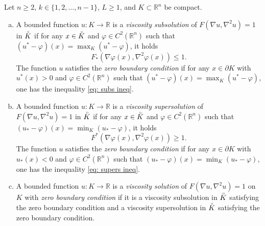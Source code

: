 \documentclass[11pt]{amsart}
\numberwithin{equation}{section}
\begin{document}
\begin{defn} \label{def:visc}
Let $n\geq 2$, $k\in\{1,2,\ldots,n-1\}$, $L\ge1$, and $K\subset \mathbb{R}^n$ be compact.
\begin{enumerate}[(a)]
\item A bounded function $u\!: K \to \mathbb{R}$ is a \textit{viscosity subsolution} of $F(\nabla u, \nabla^2 u)=1$ in $\accentset{\circ}{K}$ if for any $x\in\accentset{\circ}{K}$ and $\varphi\in C^2(\mathbb{R}^n)$ such that $(u^{\ast}-\varphi)(x)=\max_K (u^{\ast}-\varphi)$, it holds
\begin{equation}\label{eq: subs ineq}
F_{\ast}(\nabla \varphi(x), \nabla^2 \varphi(x))\leq 1.
\end{equation}
The function $u$ satisfies the \textit{zero boundary condition} if for any $x\in\partial K$ with $u^{\ast}(x)>0$ and $\varphi\in C^2(\mathbb{R}^n)$ such that $(u^{\ast}-\varphi)(x)=\max_K (u^{\ast}-\varphi)$, one has the inequality \eqref{eq: subs ineq}. \\
\item A bounded function $u\!: K \to \mathbb{R}$ is a \textit{viscosity supersolution} of $F(\nabla u, \nabla^2 u)=1$ in $\accentset{\circ}{K}$ if for any $x\in\accentset{\circ}{K}$ and $\varphi\in C^2(\mathbb{R}^n)$ such that $(u_{\ast}-\varphi)(x)=\min_K (u_{\ast}-\varphi)$, it holds
\begin{equation}\label{eq: supers ineq}
F^{\ast}(\nabla \varphi(x), \nabla^2 \varphi(x))\geq 1.
\end{equation}
The function $u$ satisfies the \textit{zero boundary condition} if for any $x\in\partial K$ with $u_{\ast}(x)<0$ and $\varphi\in C^2(\mathbb{R}^n)$ such that $(u_{\ast}-\varphi)(x)=\min_K (u_{\ast}-\varphi)$, one has the inequality \eqref{eq: supers ineq}. \\
\item A bounded function $u\!: K \to \mathbb{R}$ is a \textit{viscosity solution} of $F(\nabla u, \nabla^2 u)=1$ on $K$ with \textit{zero boundary condition} if it is a viscosity subsolution in $\accentset{\circ}{K}$ satisfying the zero boundary condition and a viscosity supersolution in $\accentset{\circ}{K}$ satisfying the zero boundary condition. 
\end{enumerate}
\end{defn}

\smallskip
\end{document}
